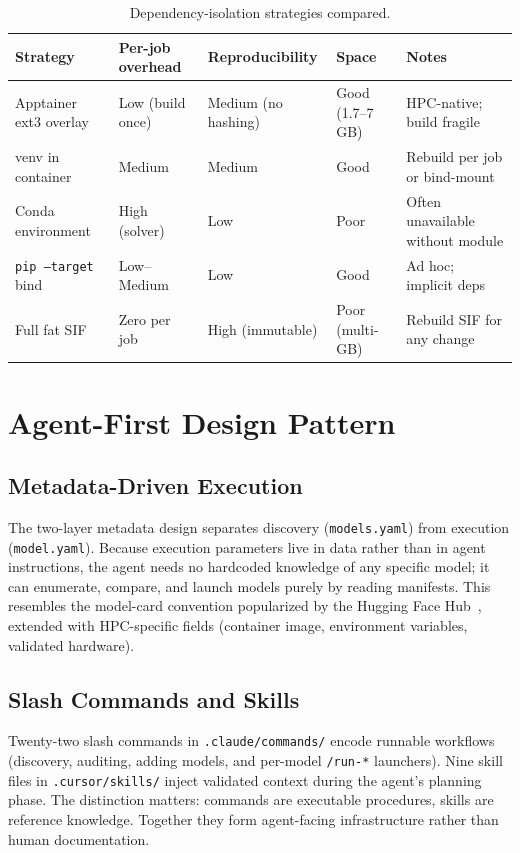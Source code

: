 \documentclass[11pt]{article}
\newcommand{\code}[1]{\texttt{#1}}
\newcommand{\file}[1]{\texttt{\small #1}}
\begin{document}
\begin{table}[ht]
\centering
\footnotesize
\caption{Dependency-isolation strategies compared.}
\label{tab:isolation}
\begin{tabular}{@{}p{3.1cm}p{2.0cm}p{2.0cm}p{2.0cm}p{3.0cm}@{}}
\toprule
\textbf{Strategy} & \textbf{Per-job overhead} & \textbf{Reproducibility} & \textbf{Space} & \textbf{Notes} \\
\midrule
Apptainer ext3 overlay & Low (build once) & Medium (no hashing) & Good (1.7--7 GB) & HPC-native; build fragile \\
venv in container & Medium & Medium & Good & Rebuild per job or bind-mount \\
Conda environment & High (solver) & Low & Poor & Often unavailable without module \\
\code{pip --target} bind & Low--Medium & Low & Good & Ad hoc; implicit deps \\
Full fat SIF & Zero per job & High (immutable) & Poor (multi-GB) & Rebuild SIF for any change \\
\bottomrule
\end{tabular}
\end{table}

\section{Agent-First Design Pattern}
\label{sec:agent}

\subsection{Metadata-Driven Execution}
The two-layer metadata design separates discovery (\file{models.yaml}) from
execution (\file{model.yaml}). Because execution parameters live in data rather
than in agent instructions, the agent needs no hardcoded knowledge of any specific
model; it can enumerate, compare, and launch models purely by reading manifests.
This resembles the model-card convention popularized by the Hugging Face
Hub~\cite{lhoest2021huggingface,wolf2020huggingface}, extended with HPC-specific
fields (container image, environment variables, validated hardware).

\subsection{Slash Commands and Skills}
Twenty-two slash commands in \file{.claude/commands/} encode runnable workflows
(discovery, auditing, adding models, and per-model \code{/run-*} launchers). Nine
skill files in \file{.cursor/skills/} inject validated context during the agent's
planning phase. The distinction matters: commands are executable procedures, skills
are reference knowledge. Together they form agent-facing infrastructure rather than
human documentation.
\end{document}
